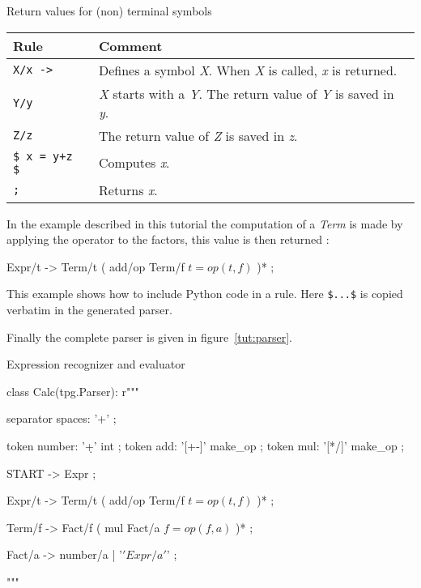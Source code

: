 \begin{tableau}
\caption{Return values for (non) terminal symbols}          \label{tut:ret_val}
\begin{tabular}{| l | p{9cm} |}
\hline
    Rule & Comment \\
\hline
    \verb!X/x ->!           & Defines a symbol \emph{X}. When \emph{X} is called, \emph{x} is returned. \\
    \verb!Y/y!              & \emph{X} starts with a \emph{Y}. The return value of \emph{Y} is saved in \emph{y}. \\
    \verb!Z/z!              & The return value of \emph{Z} is saved in \emph{z}. \\
    \verb!$ x = y+z $!      & Computes \emph{x}. \\
    \verb!;!                & Returns \emph{x}. \\
\hline
\end{tabular}
\end{tableau}

In the example described in this tutorial the computation of a \emph{Term} is made by applying the operator to the factors, this value is then returned :

\begin{verbatimtab}[4]
    Expr/t -> Term/t ( add/op Term/f $t=op(t,f)$ )* ;
\end{verbatimtab}

This example shows how to include Python code in a rule. Here \verb!$...$! is copied verbatim in the generated parser.

Finally the complete parser is given in figure~\ref{tut:parser}.

\begin{code}
\caption{Expression recognizer and evaluator}               \label{tut:parser}
\begin{verbatimtab}[4]
class Calc(tpg.Parser):
    r"""

    separator spaces: '\s+' ;

    token number: '\d+' int ;
    token add: '[+-]' make_op ;
    token mul: '[*/]' make_op ;

    START -> Expr ;

    Expr/t -> Term/t ( add/op Term/f $t=op(t,f)$ )* ;

    Term/f -> Fact/f ( mul Fact/a $f=op(f,a)$ )* ;

    Fact/a -> number/a | '\(' Expr/a '\)' ;

    """
\end{verbatimtab}
\end{code}

